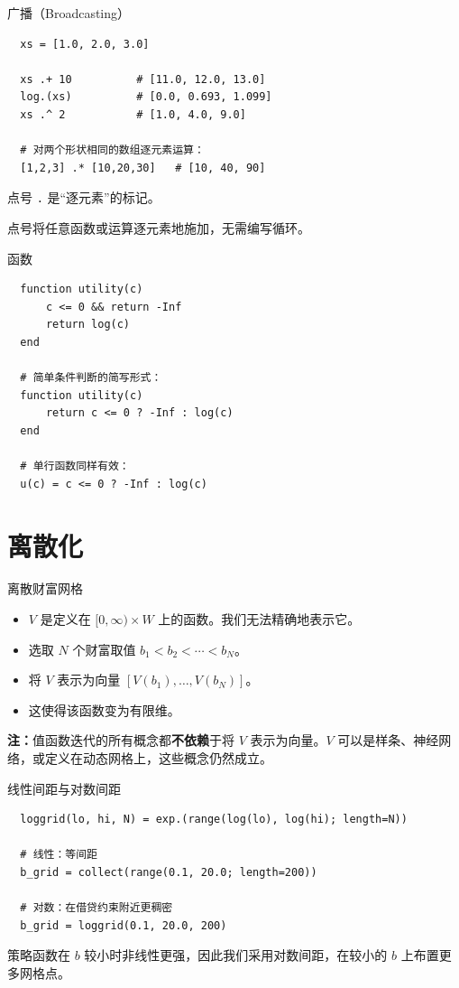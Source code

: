 \documentclass[10pt,aspectratio=169]{beamer}
\begin{document}
\begin{frame}[fragile]{广播（Broadcasting）}
  \begin{lstlisting}
  xs = [1.0, 2.0, 3.0]

  xs .+ 10          # [11.0, 12.0, 13.0]
  log.(xs)          # [0.0, 0.693, 1.099]
  xs .^ 2           # [1.0, 4.0, 9.0]

  # 对两个形状相同的数组逐元素运算：
  [1,2,3] .* [10,20,30]   # [10, 40, 90]
  \end{lstlisting}
  点号 \texttt{.} 是``逐元素''的标记。

  点号将任意函数或运算逐元素地施加，无需编写循环。
\end{frame}

\begin{frame}[fragile]{函数}
  \begin{lstlisting}
  function utility(c)
      c <= 0 && return -Inf
      return log(c)
  end

  # 简单条件判断的简写形式：
  function utility(c)
      return c <= 0 ? -Inf : log(c)
  end

  # 单行函数同样有效：
  u(c) = c <= 0 ? -Inf : log(c)
  \end{lstlisting}
\end{frame}

\section{离散化}

\begin{frame}{离散财富网格}
  \begin{itemize}
    \item $V$ 是定义在 $[0, \infty) \times W$ 上的函数。我们无法精确地表示它。
    \item 选取 $N$ 个财富取值 $b_1 < b_2 < \cdots < b_N$。
    \item 将 $V$ 表示为向量 $[V(b_1), \ldots, V(b_N)]$。
    \item 这使得该函数变为有限维。
  \end{itemize}
  \textbf{注：}值函数迭代的所有概念都\textbf{不依赖}于将 $V$ 表示为向量。$V$ 可以是样条、神经网络，或定义在动态网格上，这些概念仍然成立。
\end{frame}

\begin{frame}[fragile]{线性间距与对数间距}
  \begin{lstlisting}
  loggrid(lo, hi, N) = exp.(range(log(lo), log(hi); length=N))

  # 线性：等间距
  b_grid = collect(range(0.1, 20.0; length=200))

  # 对数：在借贷约束附近更稠密
  b_grid = loggrid(0.1, 20.0, 200)
  \end{lstlisting}
  策略函数在 $b$ 较小时非线性更强，因此我们采用对数间距，在较小的 $b$ 上布置更多网格点。
\end{frame}
\end{document}
